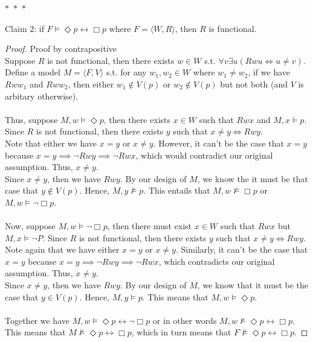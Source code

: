\documentclass[12pt]{article}
\newcommand{\B}{\Box}
\newcommand{\D}{\Diamond}
\newcommand{\s}{\vDash}
\newcommand{\ns}{\nvDash}
\begin{document}
\noindent
\begin{center}
    $\ast$~$\ast$~$\ast$
\end{center}
Claim 2: if $F \vDash \D p \leftrightarrow \B p$ where $F = \langle W, R \rangle$, then $R$ is functional. 
\begin{proof} Proof by contrapositive\\
    Suppose $R$ is not functional, then there exists $w \in W$ s.t. $\forall v \exists u (Rwu \iff u \neq v)$.
    Define a model $M = \langle F, V \rangle$ s.t. for any $w_1, w_2 \in W$ where $w_1 \neq w_2$, if we have $Rww_1$ and $Rww_2$, then either $w_1 \notin V(p)$ or $w_2 \notin V(p)$ but not both (and $V$ is arbitary otherwise).\\
    \\
    Thus, suppose $M, w \s \D p$, then there exists $x \in W$ such that $Rwx$ and $M, x \s p$.
    Since $R$ is not functional, then there exists $y$ such that $x \neq y \iff Rwy$.\\
    Note that either we have $x = y$ or $x \neq y$. 
    However, it can't be the case that $x = y$ because $x = y \implies \neg Rwy \implies \neg Rwx$, which would contradict our original assumption.
    Thus, $x \neq y$.\\
    Since $x \neq y$, then we have $Rwy$.
    By our design of $M$, we know the it must be that case that $y \notin V(p)$.
    Hence, $M, y \ns p$. This entails that $M, w \ns \B p$ or $M, w \s \neg \B p$.\\
    \\
    Now, suppose $M, w \s \neg \B p$, then there must exist $x \in W$ such that $Rwx$ but $M,x \s \neg P$.
    Since $R$ is not functional, then there exists $y$ such that $x \neq y \iff Rwy$.\\
    Note again that we have either $x = y$ or $x \neq y$. 
    Similarly, it can't be the case that $x = y$ because $x = y \implies \neg Rwy \implies \neg Rwx$, which contradicts our original assumption.
    Thus, $x \neq y$.\\
    Since $x \neq y$, then we have $Rwy$. By our design of $M$, we know that it must be the case that $y \in V(p)$.
    Hence, $M, y \s p$. This means that $M, w \s \D p$.\\
    \\
    Together we have $M, w \s \D p \leftrightarrow \neg \B p$ or in other words $M, w \ns \D p \leftrightarrow \B p$. 
    This means that $M \ns \D p \leftrightarrow \B p$, which in turn means that $F \ns \D p \leftrightarrow \B p$.
\end{proof}
\end{document}
